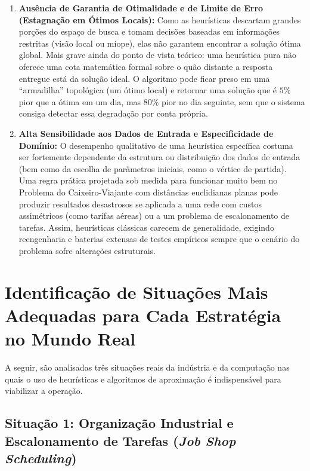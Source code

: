 \begin{enumerate}
    \item \textbf{Ausência de Garantia de Otimalidade e de Limite de Erro (Estagnação em Ótimos Locais):} Como as heurísticas descartam grandes porções do espaço de busca e tomam decisões baseadas em informações restritas (visão local ou míope), elas não garantem encontrar a solução ótima global. Mais grave ainda do ponto de vista teórico: uma heurística pura não oferece uma cota matemática formal sobre o quão distante a resposta entregue está da solução ideal. O algoritmo pode ficar preso em uma ``armadilha'' topológica (um ótimo local) e retornar uma solução que é $5\%$ pior que a ótima em um dia, mas $80\%$ pior no dia seguinte, sem que o sistema consiga detectar essa degradação por conta própria.
    \item \textbf{Alta Sensibilidade aos Dados de Entrada e Especificidade de Domínio:} O desempenho qualitativo de uma heurística específica costuma ser fortemente dependente da estrutura ou distribuição dos dados de entrada (bem como da escolha de parâmetros iniciais, como o vértice de partida). Uma regra prática projetada sob medida para funcionar muito bem no Problema do Caixeiro-Viajante com distâncias euclidianas planas pode produzir resultados desastrosos se aplicada a uma rede com custos assimétricos (como tarifas aéreas) ou a um problema de escalonamento de tarefas. Assim, heurísticas clássicas carecem de generalidade, exigindo reengenharia e baterias extensas de testes empíricos sempre que o cenário do problema sofre alterações estruturais.
\end{enumerate}

\section{Identificação de Situações Mais Adequadas para Cada Estratégia no Mundo Real}

A seguir, são analisadas três situações reais da indústria e da computação nas quais o uso de heurísticas e algoritmos de aproximação é indispensável para viabilizar a operação.

\subsection{Situação 1: Organização Industrial e Escalonamento de Tarefas (\textit{Job Shop Scheduling})}

